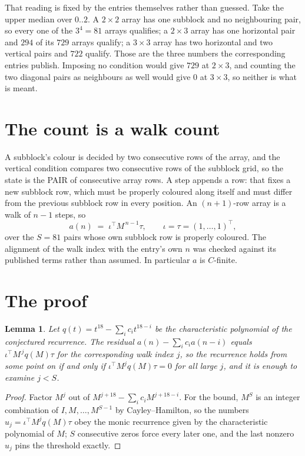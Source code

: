 \documentclass[11pt,a4paper]{article}
\theoremstyle{plain}
\newtheorem{lemma}[theorem]{Lemma}
\theoremstyle{definition}
\begin{document}
That reading is fixed by the entries themselves rather than guessed. Take the upper median
over $0..2$. A $2\times2$ array has one subblock and no neighbouring pair, so every one of the
$3^4=81$ arrays qualifies; a $2\times3$ array has one horizontal pair and $294$ of its $729$
arrays qualify; a $3\times3$ array has two horizontal and two vertical pairs and $722$
qualify. Those are the three numbers the corresponding entries publish. Imposing no condition
would give $729$ at $2\times3$, and counting the two diagonal pairs as neighbours as well
would give $0$ at $3\times3$, so neither is what is meant.

\section{The count is a walk count}

A subblock's colour is decided by two consecutive rows of the array, and
the vertical condition compares two consecutive rows of the subblock grid, so the state is the
PAIR of consecutive array rows. A step appends a row: that fixes a new subblock row, which
must be properly coloured along itself and must differ from the previous subblock row in every
position. An $(n+1)$-row array is a walk of $n-1$ steps, so
\[
a(n)\;=\;\iota^{\!\top}M^{\,n-1}\tau,\qquad\iota=\tau=(1,\dots,1)^{\!\top},
\]
over the $S=81$ pairs whose own subblock row is properly coloured.
The alignment of the walk index with the entry's own $n$ was checked against its published
terms rather than assumed. In particular $a$ is $C$-finite.

\section{The proof}

\begin{lemma}\label{lem:crit}
Let $q(t)=t^{18}-\sum_i c_it^{18-i}$ be the characteristic polynomial of the
conjectured recurrence. The residual $a(n)-\sum_ic_ia(n-i)$ equals
$\iota^{\!\top}M^{\,j}q(M)\tau$ for the corresponding walk index $j$, so the recurrence
holds from some point on if and only if $\iota^{\!\top}M^{j}q(M)\tau=0$ for all large $j$,
and it is enough to examine $j<S$.
\end{lemma}

\begin{proof}
Factor $M^{j}$ out of $M^{j+18}-\sum_ic_iM^{j+18-i}$. For the bound, $M^{S}$
is an integer combination of $I,M,\dots,M^{S-1}$ by Cayley--Hamilton, so the numbers
$u_j=\iota^{\!\top}M^{j}q(M)\tau$ obey the monic recurrence given by the characteristic
polynomial of $M$; $S$ consecutive zeros force every later one, and the last nonzero $u_j$
pins the threshold exactly.
\end{proof}
\end{document}
